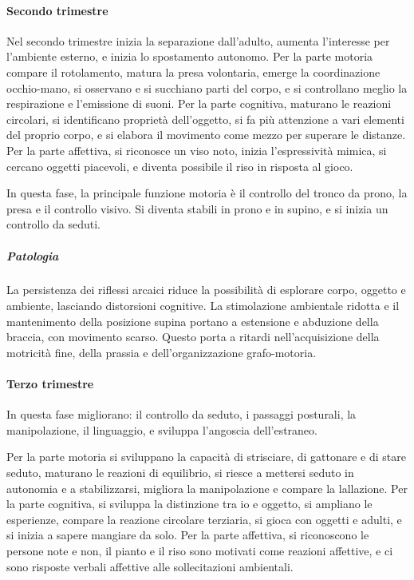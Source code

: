 \paragraph{Secondo trimestre}
Nel secondo trimestre inizia la separazione dall'adulto, aumenta l'interesse per l'ambiente esterno, e inizia lo
spostamento autonomo.
Per la parte motoria compare il rotolamento, matura la presa volontaria, emerge la coordinazione occhio-mano, si osservano
e si succhiano parti del corpo, e si controllano meglio la respirazione e l'emissione di suoni.
Per la parte cognitiva, maturano le reazioni circolari, si identificano proprietà dell'oggetto, si fa più attenzione a
vari elementi del proprio corpo, e si elabora il movimento come mezzo per superare le distanze.
Per la parte affettiva, si riconosce un viso noto, inizia l'espressività mimica, si cercano oggetti piacevoli, e diventa
possibile il riso in risposta al gioco.

In questa fase, la principale funzione motoria è il controllo del tronco da prono, la presa e il controllo visivo. Si
diventa stabili in prono e in supino, e si inizia un controllo da seduti.

\subparagraph{Patologia}
La persistenza dei riflessi arcaici riduce la possibilità di esplorare corpo, oggetto e ambiente, lasciando distorsioni
cognitive.
La stimolazione ambientale ridotta e il mantenimento della posizione supina portano a estensione e abduzione della braccia,
con movimento scarso. Questo porta a ritardi nell'acquisizione della motricità fine, della prassia e dell'organizzazione
grafo-motoria.

\paragraph{Terzo trimestre}
In questa fase migliorano: il controllo da seduto, i passaggi posturali, la manipolazione, il linguaggio, e sviluppa
l'angoscia dell'estraneo.

Per la parte motoria si sviluppano la capacità di strisciare, di gattonare e di stare seduto, maturano le reazioni di
equilibrio, si riesce a mettersi seduto in autonomia e a stabilizzarsi, migliora la manipolazione e compare la lallazione.
Per la parte cognitiva, si sviluppa la distinzione tra io e oggetto, si ampliano le esperienze, compare la reazione
circolare terziaria, si gioca con oggetti e adulti, e si inizia a sapere mangiare da solo.
Per la parte affettiva, si riconoscono le persone note e non, il pianto e il riso sono motivati come reazioni affettive, e
ci sono risposte verbali affettive alle sollecitazioni ambientali.

